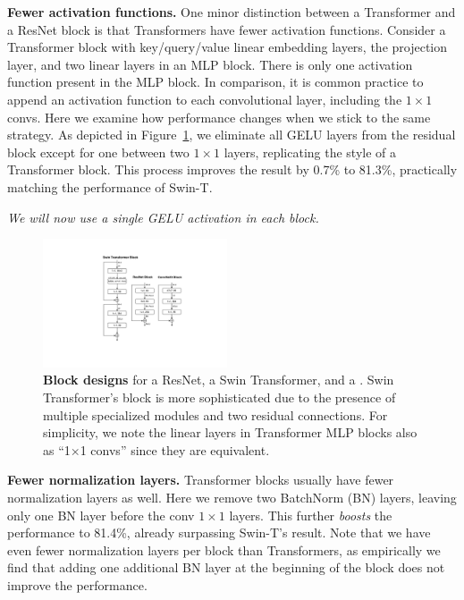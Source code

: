 \documentclass[10pt,twocolumn,letterpaper]{article}
\renewcommand{\paragraph}[1]{\vspace{1.25mm}\noindent\textbf{#1}}
\begin{document}
\paragraph{Fewer activation functions.}
One minor distinction between a Transformer and a ResNet block is that Transformers have fewer activation functions. Consider a Transformer block with key/query/value linear embedding layers, the projection layer, and two linear layers in an MLP block. There is only one activation function present in the MLP block. In comparison, it is common practice to append an activation function to each convolutional layer, including the $1\times1$ convs. Here we examine how performance changes when we stick to the same strategy. As depicted in Figure~\ref{fig:block}, we eliminate all GELU layers from the residual block except for one between two $1\times1$ layers, replicating the style of a Transformer block. This process improves the result by 0.7\% to 81.3\%, practically matching the performance of Swin-T. 


\textit{We will now use a single GELU activation in each block.}

\begin{figure}[t]
\centering
\includegraphics[width=0.485\textwidth]{figs/block_v4.pdf}
\vspace{-2em}
\caption{\textbf{Block designs} for a ResNet, a Swin Transformer, and a \cnn. Swin Transformer's block is more sophisticated due to the presence of multiple specialized modules and two residual connections. For simplicity, we note the linear layers in Transformer MLP blocks also as ``1$\times$1 convs'' since they are equivalent.}
\label{fig:block}
\vspace{-1em}
\end{figure}

\paragraph{Fewer normalization layers.}
Transformer blocks usually have fewer normalization layers as well. Here we remove two BatchNorm (BN) layers, leaving only one BN layer before the conv $1\times1$ layers. This further \textit{boosts} the performance to 81.4\%, already surpassing Swin-T's result. Note that we have even fewer normalization layers per block than Transformers, as empirically we find that adding one additional BN layer at the beginning of the block does not improve the performance. 
\end{document}

